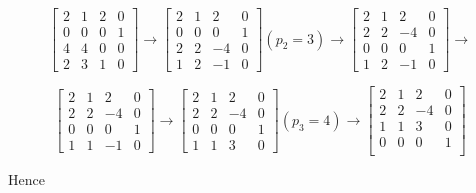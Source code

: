 \[
    \begin{bmatrix} 
        2 & 1 & 2 & 0 \\ 
        0 & 0 & 0 & 1 \\ 
        4 & 4 & 0 & 0 \\ 
        2 & 3 & 1 & 0
    \end{bmatrix}
    \rightarrow
    \begin{bmatrix} 
        2 & 1 & 2 & 0 \\ 
        0 & 0 & 0 & 1 \\ 
        2 & 2 & -4 & 0 \\ 
        1 & 2 & -1 & 0
    \end{bmatrix}
    (p_2 = 3)
    \rightarrow
     \begin{bmatrix} 
        2 & 1 & 2 & 0 \\  
        2 & 2 & -4 & 0 \\ 
        0 & 0 & 0 & 1 \\ 
        1 & 2 & -1 & 0
    \end{bmatrix}
    \rightarrow
\]

\[
    \begin{bmatrix} 
        2 & 1 & 2 & 0 \\  
        2 & 2 & -4 & 0 \\ 
        0 & 0 & 0 & 1 \\ 
        1 & 1 & -1 & 0
    \end{bmatrix}
    \rightarrow
    \begin{bmatrix} 
        2 & 1 & 2 & 0 \\  
        2 & 2 & -4 & 0 \\ 
        0 & 0 & 0 & 1 \\ 
        1 & 1 & 3 & 0
    \end{bmatrix}
    (p_3 = 4)
    \rightarrow
    \begin{bmatrix} 
        2 & 1 & 2 & 0 \\  
        2 & 2 & -4 & 0 \\  
        1 & 1 & 3 & 0 \\
        0 & 0 & 0 & 1 \\ 
    \end{bmatrix}
\]

Hence 

